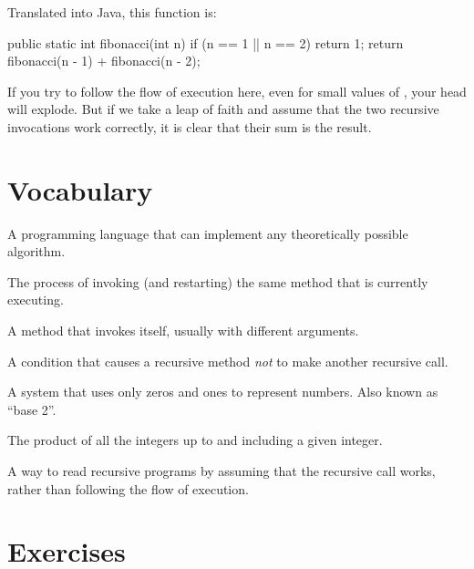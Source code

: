 Translated into Java, this function is:

\begin{code}
public static int fibonacci(int n) {
    if (n == 1 || n == 2) {
        return 1;
    }
    return fibonacci(n - 1) + fibonacci(n - 2);
}
\end{code}

If you try to follow the flow of execution here, even for small values of , your head will explode.
But if we take a leap of faith and assume that the two recursive invocations work correctly, it is clear that their sum is the result.


\section{Vocabulary}

\begin{description}




A programming language that can implement any theoretically possible algorithm.

The process of invoking (and restarting) the same method that is currently executing.

A method that invokes itself, usually with different arguments.

A condition that causes a recursive method {\em not} to make another recursive call.

A system that uses only zeros and ones to represent numbers.
Also known as ``base 2''.

The product of all the integers up to and including a given integer.

A way to read recursive programs by assuming that the recursive call works, rather than following the flow of execution.

\end{description}


\section{Exercises}

